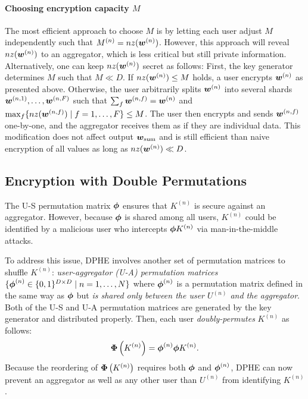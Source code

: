 \documentclass[10pt,twocolumn,letterpaper]{article}
\def\sub#1{_{\rm #1}}
\def\vct#1{\mbox{\boldmath $#1$}}
\def\ui#1{^{(#1)}}
\def\perm{\vct{\phi}}
\def\dperm#1{\vct{\Phi}\left(#1\right)}
\def\nz#1{nz(#1)}
\begin{document}
\paragraph{Choosing encryption capacity $M$}
The most efficient approach to choose $M$ is by letting each user adjust $M$ independently such that $M\ui{n}=\nz{\vct{w}\ui{n}}$. However, this approach will reveal $\nz{\vct{w}\ui{n}}$ to an aggregator, which is less critical but still private information. Alternatively, one can keep $\nz{\vct{w}\ui{n}}$ secret as follows: First, the key generator determines $M$ such that $M \ll D$. If $\nz{\vct{w}\ui{n}}\leq M$ holds, a user encrypts $\vct{w}\ui{n}$ as presented above. Otherwise, the user arbitrarily splits $\vct{w}\ui{n}$ into several shards $\vct{w}\ui{n, 1},\dots,\vct{w}\ui{n, F}$ such that $\sum_f \vct{w}\ui{n, f} = \vct{w}\ui{n}$ and $\max_f\{\nz{\vct{w}\ui{n, f}}\mid f=1,\dots,F\}\leq M$. The user then encrypts and sends $\vct{w}\ui{n, f}$ one-by-one, and the aggregator receives them as if they are individual data. This modification does not affect output $\vct{w}\sub{sum}$ and is still efficient than naive encryption of all values as long as $\nz{\vct{w}\ui{n}} \ll D$.

\subsection{Encryption with Double Permutations}
\label{subsec:dperm2}

The U-S permutation matrix $\perm$ ensures that $K\ui{n}$ is secure against an aggregator. However, because $\perm$ is shared among all users, $K\ui{n}$ could be identified by a malicious user who intercepts $\perm K\ui{n}$ via man-in-the-middle attacks.

To address this issue, DPHE involves another set of permutation matrices to shuffle $K\ui{n}$: \emph{user-aggregator (U-A) permutation matrices} $\{\perm\ui{n}\in\{0, 1\}^{D\times D}\mid n= 1,\dots,N\}$ where $\perm\ui{n}$ is a permutation matrix defined in the same way as $\perm$ but \emph{is shared only between the user $U\ui{n}$ and the aggregator}. Both of the U-S and U-A permutation matrices are generated by the key generator and distributed properly. Then, each user \emph{doubly-permutes} $K\ui{n}$ as follows: 
\begin{equation}
\dperm{K\ui{n}} = \perm\ui{n}\perm K\ui{n}.
\label{eq:partial_reorder}
\end{equation}
Because the reordering of $\dperm{K\ui{n}}$ requires both $\perm$ and $\perm\ui{n}$, DPHE can now prevent an aggregator as well as any other user than $U\ui{n}$ from identifying $K\ui{n}$.
\end{document}
